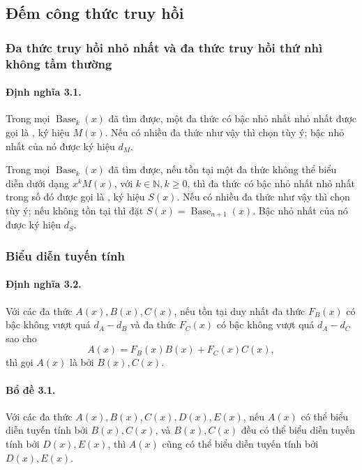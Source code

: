 \documentclass[11pt]{article}
\newcommand{\Base}{\operatorname{Base}}
\begin{document}
\subsection{Đếm công thức truy hồi}

\subsubsection{Đa thức truy hồi nhỏ nhất và đa thức truy hồi thứ nhì không tầm thường}

\paragraph{Định nghĩa 3.1.}
Trong mọi \(\Base_k(x)\) đã tìm được, một đa thức có bậc nhỏ nhất nhỏ nhất
được gọi là , ký hiệu \(M(x)\). Nếu có nhiều
đa thức như vậy thì chọn tùy ý; bậc nhỏ nhất của nó được ký hiệu \(d_M\).

Trong mọi \(\Base_k(x)\) đã tìm được, nếu tồn tại một đa thức không thể biểu
diễn dưới dạng \(x^kM(x)\), với \(k\in\mathbb{N}, k\ge 0\), thì đa thức có bậc
nhỏ nhất nhỏ nhất trong số đó được gọi là , ký hiệu \(S(x)\). Nếu có nhiều đa thức như vậy thì chọn tùy ý; nếu
không tồn tại thì đặt \(S(x)=\Base_{n+1}(x)\). Bậc nhỏ nhất của nó được ký hiệu
\(d_S\).

\subsubsection{Biểu diễn tuyến tính}

\paragraph{Định nghĩa 3.2.}
Với các đa thức \(A(x),B(x),C(x)\), nếu tồn tại duy nhất đa thức \(F_B(x)\) có
bậc không vượt quá \(d_A-d_B\) và đa thức \(F_C(x)\) có bậc không vượt quá
\(d_A-d_C\) sao cho
\[
  A(x)=F_B(x)B(x)+F_C(x)C(x),
\]
thì gọi \(A(x)\) là  bởi \(B(x),C(x)\).

\paragraph{Bổ đề 3.1.}
Với các đa thức \(A(x),B(x),C(x),D(x),E(x)\), nếu \(A(x)\) có thể biểu diễn
tuyến tính bởi \(B(x),C(x)\), và \(B(x),C(x)\) đều có thể biểu diễn tuyến tính
bởi \(D(x),E(x)\), thì \(A(x)\) cũng có thể biểu diễn tuyến tính bởi
\(D(x),E(x)\).
\end{document}
